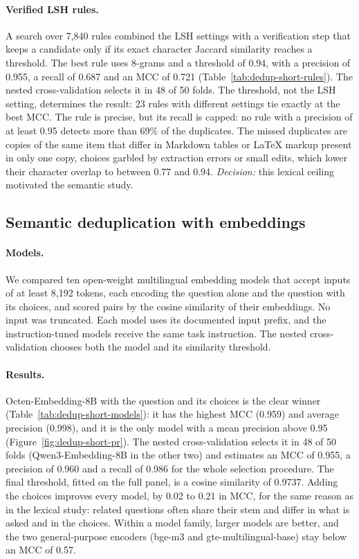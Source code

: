 \paragraph{Verified LSH rules.} A search over 7,840 rules combined the LSH
settings with a verification step that keeps a candidate only if its exact
character Jaccard similarity reaches a threshold. The best rule uses 8-grams
and a threshold of 0.94, with a precision of 0.955, a recall of 0.687 and an
MCC of 0.721 (Table~\ref{tab:dedup-short-rules}). The nested
cross-validation selects it in 48 of 50 folds. The threshold, not the LSH
setting, determines the result: 23 rules with different settings tie exactly
at the best MCC. The rule is precise, but its recall is capped: no rule with
a precision of at least 0.95 detects more than 69\% of the duplicates. The
missed duplicates are copies of the same item that differ in Markdown tables
or \LaTeX{} markup present in only one copy, choices garbled by extraction
errors or small edits, which lower their character overlap to between 0.77
and 0.94. \emph{Decision:} this lexical ceiling motivated the semantic study.

\subsection{Semantic deduplication with embeddings}
\label{app:dedup-short-semantic}

\paragraph{Models.} We compared ten open-weight multilingual embedding models
that accept inputs of at least 8,192 tokens, each encoding the question alone
and the question with its choices, and scored pairs by the cosine similarity
of their embeddings. No input was truncated. Each model uses its documented
input prefix, and the instruction-tuned models receive the same task
instruction. The nested cross-validation chooses both the model and its
similarity threshold.

\paragraph{Results.} Octen-Embedding-8B with the question and its choices is
the clear winner (Table~\ref{tab:dedup-short-models}): it has the highest MCC
(0.959) and average precision (0.998), and it is the only model with a mean
precision above 0.95 (Figure~\ref{fig:dedup-short-pr}). The nested
cross-validation selects it in 48 of 50 folds (Qwen3-Embedding-8B in the
other two) and estimates an MCC of 0.955, a precision of 0.960 and a recall of
0.986 for the whole selection procedure. The final threshold, fitted on the
full panel, is a cosine similarity of 0.9737. Adding the choices improves
every model, by 0.02 to 0.21 in MCC, for the same reason as in the lexical
study: related questions often share their stem and differ in what is asked
and in the choices. Within a model family, larger models are better, and the
two general-purpose encoders (bge-m3 and gte-multilingual-base) stay below an
MCC of 0.57.

